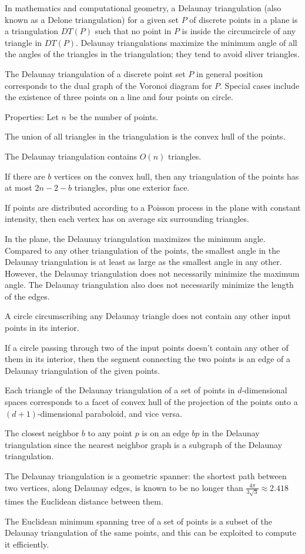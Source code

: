 In mathematics and computational geometry, a Delaunay triangulation (also known as a Delone triangulation) for a given set $P$ of discrete points in a plane is a triangulation $DT(P)$ such that no point in $P$ is inside the circumcircle of any triangle in $DT(P)$. Delaunay triangulations maximize the minimum angle of all the angles of the triangles in the triangulation; they tend to avoid sliver triangles.

The Delaunay triangulation of a discrete point set $P$ in general position corresponds to the dual graph of the Voronoi diagram for $P$. Special cases include the existence of three points on a line and four points on circle.

Properties: Let $n$ be the number of points.
\begin{compactenum}
\item The union of all triangles in the triangulation is the convex hull of the points.
\item The Delaunay triangulation contains $O(n)$ triangles.
\item If there are $b$ vertices on the convex hull, then any triangulation of the points has at most $2n-2-b$ triangles, plus one exterior face.
\item If points are distributed according to a Poisson process in the plane with constant intensity, then each vertex has on average six surrounding triangles.
\item In the plane, the Delaunay triangulation maximizes the minimum angle. Compared to any other triangulation of the points, the smallest angle in the Delaunay triangulation is at least as large as the smallest angle in any other. However, the Delaunay triangulation does not necessarily minimize the maximum angle. The Delaunay triangulation also does not necessarily minimize the length of the edges.
\item A circle circumscribing any Delaunay triangle does not contain any other input points in its interior.
\item If a circle passing through two of the input points doesn't contain any other of them in its interior, then the segment connecting the two points is an edge of a Delaunay triangulation of the given points.
\item Each triangle of the Delaunay triangulation of a set of points in $d$-dimensional spaces corresponds to a facet of convex hull of the projection of the points onto a $(d+1)$-dimensional paraboloid, and vice versa.
\item The closest neighbor $b$ to any point $p$ is on an edge $bp$ in the Delaunay triangulation since the nearest neighbor graph is a subgraph of the Delaunay triangulation.
\item The Delaunay triangulation is a geometric spanner: the shortest path between two vertices, along Delaunay edges, is known to be no longer than ${\frac {4\pi }{3{\sqrt {3}}}}\approx 2.418$ times the Euclidean distance between them.
\item The Euclidean minimum spanning tree of a set of points is a subset of the Delaunay triangulation of the same points, and this can be exploited to compute it efficiently.
\end{compactenum}

